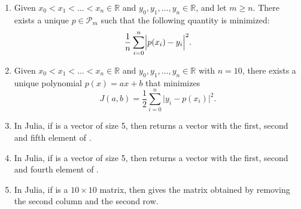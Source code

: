 \documentclass[a4paper]{article}
\begin{document}
\begin{enumerate}
    \item
        Given $x_0 < x_1 < \dotsc < x_n \in \mathbb R$
        and $y_0, y_1, \dotsc , y_n \in \mathbb R$,
        and let $m \geq n$. 
        There exists a unique $p \in \mathcal P_m$ such that the following quantity is minimized:
        \[
            \frac{1}{n} \sum_{i=0}^{n} \Bigl\lvert p(x_i) - y_i \Bigr\rvert^2.
        \]

    \item
        Given $x_0 < x_1 < \dotsc < x_n \in \mathbb R$
        and $y_0, y_1, \dotsc , y_n \in \mathbb R$ with $n = 10$,
        there exists a unique polynomial $p(x) = ax + b$ that minimizes
        \[
            J(a, b) = \frac{1}{2} \sum_{i=0}^n \bigl\lvert y_i - p(x_i) \bigr\rvert^2.
        \]

    \item
        In Julia, if  is a vector of size 5,
        then  returns a vector with the first, second and fifth element of .

    \item
        In Julia, if  is a vector of size 5,
        then  returns a vector with the first, second and fourth element of .

    \item
        In Julia, if  is a $10\times10$ matrix,
        then  gives the matrix obtained by removing the second column and the second row.
\end{enumerate}

\ifdefined\showsolutions
\newpage
{}
\end{document}
